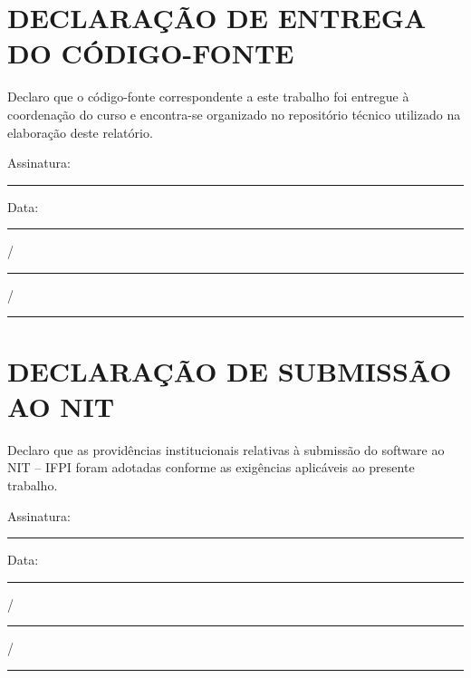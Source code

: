 \documentclass[
  12pt,
  oneside,
  a4paper,
  chapter=TITLE,
  section=TITLE,
  subsection=TITLE,
  brazil
]{abntex2}
\begin{document}
\clearpage
\begin{anexosenv}
\partanexos

\chapter{DECLARAÇÃO DE ENTREGA DO CÓDIGO-FONTE}

Declaro que o código-fonte correspondente a este trabalho foi entregue à coordenação do curso e encontra-se organizado no repositório técnico utilizado na elaboração deste relatório.

\vspace{2cm}

Assinatura: \rule{10cm}{0.4pt}

\vspace{1cm}

Data: \rule{1cm}{0.4pt}/\rule{1cm}{0.4pt}/\rule{2cm}{0.4pt}

\chapter{DECLARAÇÃO DE SUBMISSÃO AO NIT}

Declaro que as providências institucionais relativas à submissão do software ao NIT -- IFPI foram adotadas conforme as exigências aplicáveis ao presente trabalho.

\vspace{2cm}

Assinatura: \rule{10cm}{0.4pt}

\vspace{1cm}

Data: \rule{1cm}{0.4pt}/\rule{1cm}{0.4pt}/\rule{2cm}{0.4pt}

\end{anexosenv}
\end{document}

